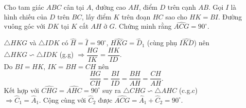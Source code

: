 \begin{bt}%
 Cho tam giác $ABC$ cân tại $A$, đường cao $AH$, điểm $D$ trên cạnh $AB$. Gọi $I$ là hình chiếu của $D$ trên $BC$, lấy điểm $K$ trên đoạn $HC$ sao cho $HK = BI$. Đường vuông góc với $DK$ tại $K$ cắt $AH$ ở $G$. Chứng minh rằng $\widehat{ACG} = 90^\circ$.
 \loigiai
  {
  \immini
  {
  $\triangle HKG$ và $\triangle IDK$ có $\widehat{H} = \widehat{I} = 90^\circ$, $\widehat{HKG} = \widehat{D}_1$ (cùng phụ $\widehat{IKD}$) nên $\triangle HKG \backsim \triangle IDK$ (g.g) $\Rightarrow \dfrac{HG}{IK} = \dfrac{HK}{ID}$.\\
  Do $BI = HK$, $IK = BH = CH$ nên $$\dfrac{HG}{CH} = \dfrac{BI}{ID} = \dfrac{BH}{AH} = \dfrac{CH}{AH}.$$
  Kết hợp với $\widehat{CHG} = \widehat{AHC} = 90^\circ$ suy ra $\triangle CHG \backsim \triangle AHC$ (c.g.c)\\
  $\Rightarrow \widehat{C}_1 = \widehat{A}_1$. Cộng cùng với $\widehat{C}_2$ được $\widehat{ACG} = \widehat{A}_1 + \widehat{C}_2 = 90^\circ$.
  }
  {
  }
  }
\end{bt}


